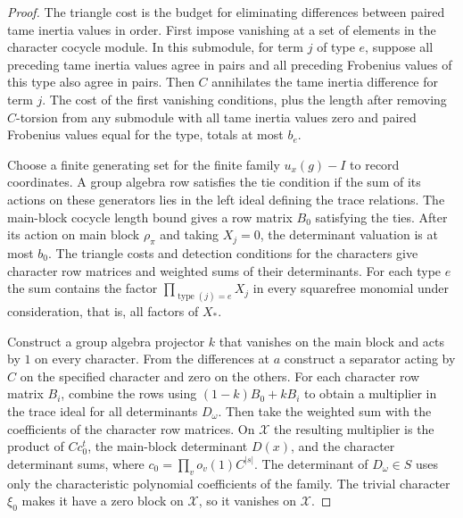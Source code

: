 \begin{proof}
The triangle cost is the budget for eliminating differences between paired tame inertia values in order. First impose vanishing at a set of elements in the character cocycle module. In this submodule, for term $j$ of type $e$, suppose all preceding tame inertia values agree in pairs and all preceding Frobenius values of this type also agree in pairs. Then $C$ annihilates the tame inertia difference for term $j$. The cost of the first vanishing conditions, plus the length after removing $C$-torsion from any submodule with all tame inertia values zero and paired Frobenius values equal for the type, totals at most $b_e$.

Choose a finite generating set for the finite family $u_x(g)-I$ to record coordinates. A group algebra row satisfies the tie condition if the sum of its actions on these generators lies in the left ideal defining the trace relations. The main-block cocycle length bound gives a row matrix $B_0$ satisfying the ties. After its action on main block $\rho_\pi$ and taking $X_j=0$, the determinant valuation is at most $b_0$. The triangle costs and detection conditions for the characters give character row matrices and weighted sums of their determinants. For each type $e$ the sum contains the factor $\prod_{\operatorname{type}(j)=e} X_j$ in every squarefree monomial under consideration, that is, all factors of $X_\ast$.

Construct a group algebra projector $k$ that vanishes on the main block and acts by $1$ on every character. From the differences at $a$ construct a separator acting by $C$ on the specified character and zero on the others. For each character row matrix $B_i$, combine the rows using $(1-k)B_0+kB_i$ to obtain a multiplier in the trace ideal for all determinants $D_\omega$. Then take the weighted sum with the coefficients of the character row matrices. On $\mathcal X$ the resulting multiplier is the product of $C c_0^t$, the main-block determinant $D(x)$, and the character determinant sums, where $c_0=\prod_v o_v(1) C^{|s|}$. The determinant of $D_\omega\in S$ uses only the characteristic polynomial coefficients of the family. The trivial character $\xi_0$ makes it have a zero block on $\mathcal X$, so it vanishes on $\mathcal X$.


\end{proof}
